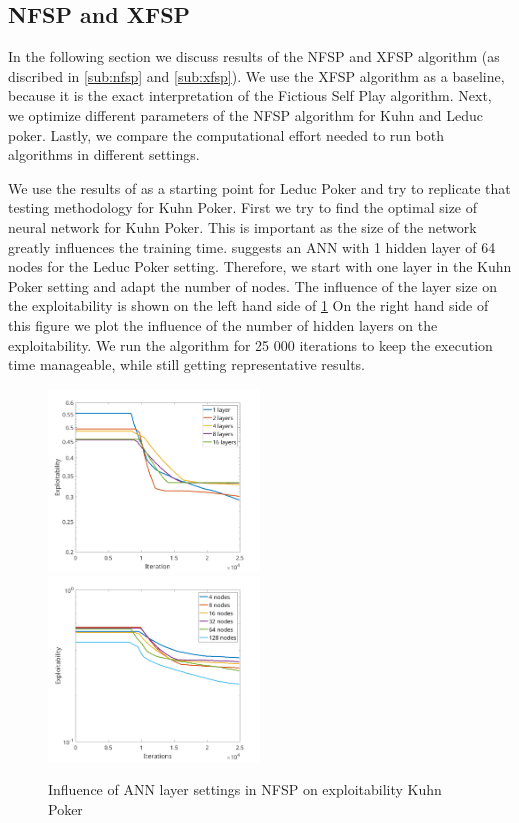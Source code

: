 \documentclass[10pt,a4paper]{article}
\begin{document}
\subsection{NFSP and XFSP}
In the following section we discuss results of the NFSP and XFSP algorithm (as discribed in \ref{sub:nfsp} and \ref{sub:xfsp}). We use the XFSP algorithm as a baseline, because it is the exact interpretation of the Fictious Self Play algorithm. Next, we optimize different parameters of the NFSP algorithm for Kuhn and Leduc poker. Lastly, we compare the computational effort needed to run both algorithms in different settings.

We use the results of \cite{heinrichphd} as a starting point for Leduc Poker and try to replicate that testing methodology for Kuhn Poker.
First we try to find the optimal size of neural network for Kuhn Poker. This is important as the size of the network greatly influences the training time.
\cite{heinrichphd} suggests an ANN with 1 hidden layer of 64 nodes for the Leduc Poker setting. Therefore, we start with one layer in the Kuhn Poker setting and adapt the number of nodes. The influence of the layer size on the exploitability is shown on the left hand side of \ref{fig:layers_kuhn}
On the right hand side of this figure we plot the influence of the number of hidden layers on the exploitability. We run the algorithm for 25 000 iterations to keep the execution time manageable, while still getting representative results.

\begin{center}
\begin{figure}[h]
\label{fig:layers_kuhn}
\includegraphics[width=0.5\textwidth]{Figures/kuhn_layers.png}
\includegraphics[width=0.5\textwidth]{Figures/kuhn_nodes.png}
\caption{Influence of ANN layer settings in NFSP on exploitability Kuhn Poker}
\end{figure}
\end{center}
\end{document}
